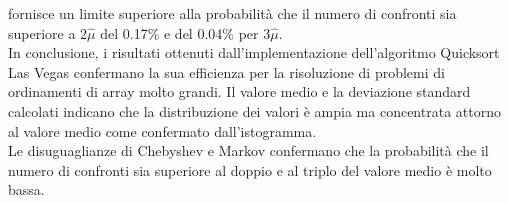 \documentclass[12pt]{article}
\begin{document}
fornisce un limite superiore alla probabilità che il numero di confronti
sia superiore a $2\hat{\mu}$ del 0.17\% e del 0.04\% per $3\hat{\mu}$.\\
In conclusione, i risultati ottenuti dall'implementazione dell'algoritmo 
Quicksort Las Vegas confermano la sua efficienza per la risoluzione di
problemi di ordinamenti di array molto grandi. Il valore medio e la 
deviazione standard calcolati indicano che la distribuzione dei valori
è ampia ma concentrata attorno al valore medio come confermato dall'istogramma.\\
Le disuguaglianze di Chebyshev e Markov confermano che la probabilità
che il numero di confronti sia superiore al doppio e al triplo del valore 
medio è molto bassa.
\end{document}
